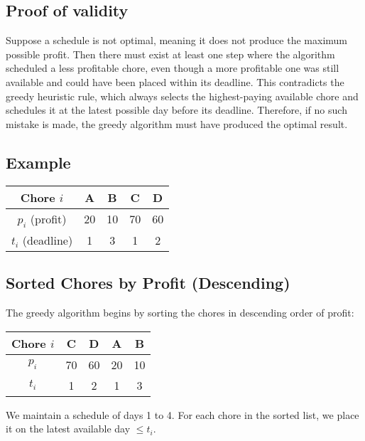 \documentclass[12pt]{article}
\begin{document}
\subsection*{Proof of validity}

Suppose a schedule is not optimal, meaning it does not produce the maximum possible profit. Then there must exist at least one step where the algorithm scheduled a less profitable chore, even though a more profitable one was still available and could have been placed within its deadline.
This contradicts the greedy heuristic rule, which always selects the highest-paying available chore and schedules it at the latest possible day before its deadline.
Therefore, if no such mistake is made, the greedy algorithm must have produced the optimal result.




\newpage
\subsection*{Example}

\begin{center}
\begin{tabular}{|c|c|c|c|c|}
\hline
Chore $i$ & A & B & C & D \\
\hline
$p_i$ (profit) & 20 & 10 & 70 & 60 \\
$t_i$ (deadline) & 1 & 3 & 1 & 2 \\
\hline
\end{tabular}
\end{center}

\subsection*{Sorted Chores by Profit (Descending)}

The greedy algorithm begins by sorting the chores in descending order of profit:

\begin{center}
\begin{tabular}{|c|c|c|c|c|}
\hline
Chore $i$ & C & D & A & B \\
\hline
$p_i$ & 70 & 60 & 20 & 10 \\
$t_i$ & 1 & 2 & 1 & 3 \\
\hline
\end{tabular}
\end{center}


We maintain a schedule of days 1 to 4. For each chore in the sorted list, we place it on the latest available day $\leq t_i$.
\end{document}
